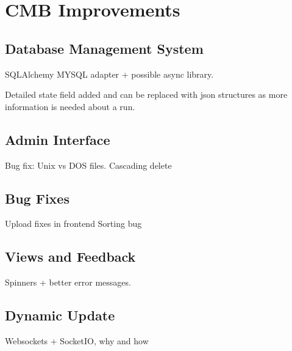 \chapter{CMB Improvements}

\section{Database Management System}
SQLAlchemy MYSQL adapter + possible async library.

Detailed state field added and can be replaced with json structures as more information is needed about a run.

\section{Admin Interface}
Bug fix: Unix vs DOS files.
Cascading delete

\section{Bug Fixes}
Upload fixes in frontend
Sorting bug

\section{Views and Feedback}
Spinners + better error messages.

\section{Dynamic Update}
Websockets + SocketIO, why and how
